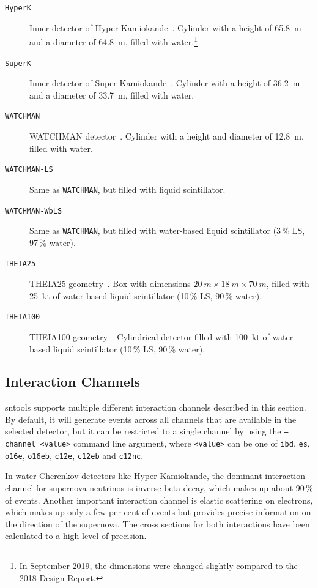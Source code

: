 \documentclass[11pt, oneside]{article}
\begin{document}
\begin{description}
\item[\texttt{HyperK}] Inner detector of Hyper-Kamiokande~\cite{HKDR2018}. Cylinder with a height of \SI{65.8}{m} and a diameter of \SI{64.8}{m}, filled with water.\footnote{In September 2019, the dimensions were changed slightly compared to the 2018 Design Report.}
\item[\texttt{SuperK}] Inner detector of Super-Kamiokande~\cite{Fukuda2003}. Cylinder with a height of \SI{36.2}{m} and a diameter of \SI{33.7}{m}, filled with water.
\item[\texttt{WATCHMAN}] WATCHMAN detector~\cite{Askins2015}. Cylinder with a height and diameter of \SI{12.8}{m}, filled with water.
\item[\texttt{WATCHMAN-LS}] Same as \texttt{WATCHMAN}, but filled with liquid scintillator.
\item[\texttt{WATCHMAN-WbLS}] Same as \texttt{WATCHMAN}, but filled with water-based liquid scintillator (3\,\% LS, 97\,\% water).
\item[\texttt{THEIA25}] THEIA25 geometry~\cite{Askins2020}. Box with dimensions $\SI{20}{m}\times\SI{18}{m}\times\SI{70}{m}$, filled with \SI{25}{kt} of water-based liquid scintillator (10\,\% LS, 90\,\% water).
\item[\texttt{THEIA100}] THEIA100 geometry~\cite{Askins2020}. Cylindrical detector filled with \SI{100}{kt} of water-based liquid scintillator (10\,\% LS, 90\,\% water).
\end{description}


\subsection{Interaction Channels} \label{sec:interaction-channels}
sntools supports multiple different interaction channels described in this section.
By default, it will generate events across all channels that are available in the selected detector, but it can be restricted to a single channel by using the \texttt{--channel <value>} command line argument, where \texttt{<value>} can be one of \texttt{ibd}, \texttt{es}, \texttt{o16e}, \texttt{o16eb}, \texttt{c12e}, \texttt{c12eb} and \texttt{c12nc}.

In water Cherenkov detectors like Hyper-Kamiokande, the dominant interaction channel for supernova neutrinos is inverse beta decay, which makes up about 90\,\% of events.
Another important interaction channel is elastic scattering on electrons, which makes up only a few per cent of events but provides precise information on the direction of the supernova.
The cross sections for both interactions have been calculated to a high level of precision.
\end{document}
